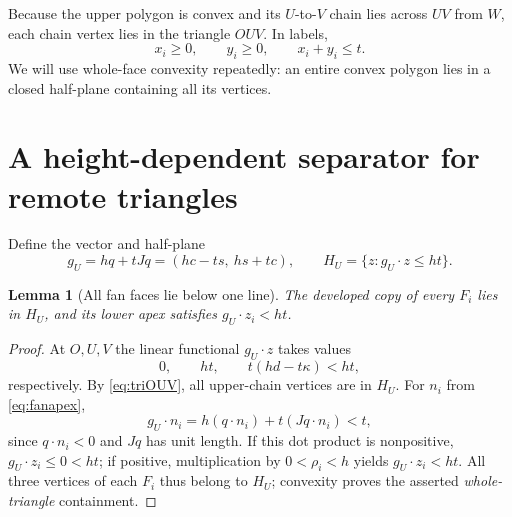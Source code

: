 \documentclass[11pt]{amsart}
\newtheorem{lemma}[theorem]{Lemma}
\begin{document}
Because the upper polygon is convex and its \(U\)-to-\(V\) chain lies across \(UV\) from \(W\), each chain vertex lies in the triangle \(OUV\). In labels,
\begin{equation}\label{eq:triOUV}
 x_i\ge0,\qquad y_i\ge0,\qquad x_i+y_i\le t.
\end{equation}
We will use whole-face convexity repeatedly: an entire convex polygon lies in a closed half-plane containing all its vertices.

\section{A height-dependent separator for remote triangles}
Define the vector and half-plane
\begin{equation}\label{eq:gU}
 g_U=hq+tJq=(hc-ts,\ hs+tc),
 \qquad H_U=\{z:g_U\cdot z\le ht\}.
\end{equation}
\begin{lemma}[All fan faces lie below one line]\label{lem:fansep}
The developed copy of every \(F_i\) lies in \(H_U\), and its lower apex satisfies \(g_U\cdot z_i<ht\).
\end{lemma}
\begin{proof}
At \(O,U,V\) the linear functional \(g_U\cdot z\) takes values
\[
 0,\qquad ht,\qquad t(hd-t\kappa)<ht,
\]
respectively. By \eqref{eq:triOUV}, all upper-chain vertices are in \(H_U\). For \(n_i\) from \eqref{eq:fanapex},
\[
 g_U\cdot n_i=h(q\cdot n_i)+t(Jq\cdot n_i)<t,
\]
since \(q\cdot n_i<0\) and \(Jq\) has unit length. If this dot product is nonpositive, \(g_U\cdot z_i\le0<ht\); if positive, multiplication by \(0<\rho_i<h\) yields \(g_U\cdot z_i<ht\). All three vertices of each \(F_i\) thus belong to \(H_U\); convexity proves the asserted \emph{whole-triangle} containment.
\end{proof}
\end{document}
